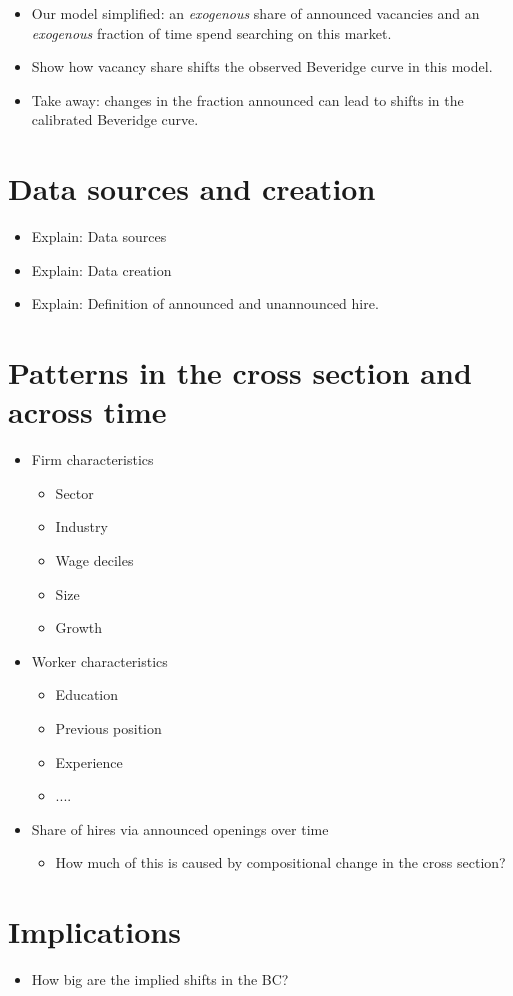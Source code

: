 \documentclass{article}
\begin{document}
\begin{itemize}
	\item Our model simplified: an \emph{exogenous} share of announced vacancies and an \emph{exogenous} fraction of time spend searching on this market.
	\item Show how vacancy share shifts the observed Beveridge curve in this model. 
	\item Take away: changes in the fraction announced can lead to shifts in the calibrated Beveridge curve.
\end{itemize}


\section{Data sources and creation}

\begin{itemize}
	\item Explain: Data sources
	\item Explain: Data creation
	\item Explain: Definition of announced and unannounced hire.
\end{itemize}

\section{Patterns in the cross section and across time}

\begin{itemize}
	\item Firm characteristics
	\begin{itemize}
		\item Sector
		\item Industry
		\item Wage deciles
		\item Size
		\item Growth
	\end{itemize}
	\item Worker characteristics
		\begin{itemize}
		\item Education
		\item Previous position
		\item Experience
		\item ....
    \end{itemize}
	\item Share of hires via announced openings over time
	\begin{itemize}
		\item How much of this is caused by compositional change in the cross section?
	\end{itemize}
\end{itemize}

\section{Implications}

\begin{itemize}
	\item How big are the implied shifts in the BC?
\end{itemize}
\end{document}
